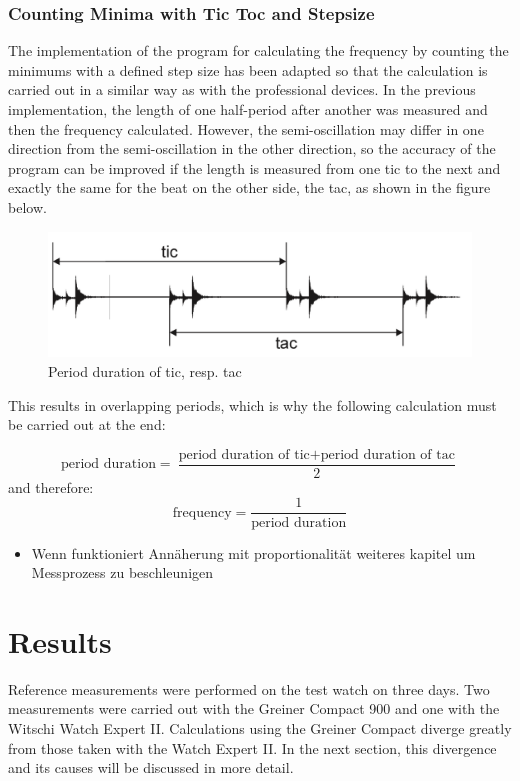 \documentclass[12pt, a4paper]{report}
\begin{document}
    \subsection{Counting Minima with Tic Toc and Stepsize}
  The implementation of the program for calculating the frequency by counting the minimums with a defined step size has been adapted so that the calculation is carried out in a similar way as with the professional devices. In the previous implementation, the length of one half-period after another was measured and then the frequency calculated. However, the semi-oscillation may differ in one direction from the semi-oscillation in the other direction, so the accuracy of the program can be improved if the length is measured from one tic to the next and exactly the same for the beat on the other side, the tac, as shown in the figure below. 
       \noindent
    \begin{figure}[H]
        \centering
        \includegraphics[scale=0.4]{Images/gangdeviation.png}
    
    \caption{Period duration of tic, resp. tac}
    \end{figure}    
  
  This results in overlapping periods, which is why the following calculation must be carried out at the end:
  
       \begin{displaymath}
     \text{period duration} = \frac{\text{period duration of tic} + \text{period duration of tac}}{2} 
     \end{displaymath}
  and therefore: 
       \begin{displaymath}
      \text{frequency}= \frac{1}{\text{period duration}}
     \end{displaymath}
     
         \begin{itemize}
    \item Wenn funktioniert Annäherung mit proportionalität weiteres kapitel um Messprozess zu beschleunigen
    \end{itemize}
     
    
    \chapter{Results}
        Reference measurements were performed on the test watch on three days. Two measurements were carried out with the Greiner Compact 900 and one with the Witschi Watch Expert II. Calculations using the Greiner Compact diverge greatly from those taken with the Watch Expert II. In the next section, this divergence and its causes will be discussed in more detail. 
\end{document}
